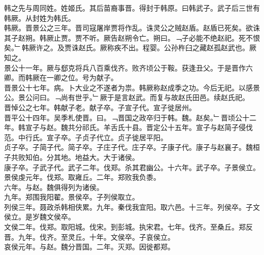 \documentclass{zhvt-classic}
\begin{document}
\hspace*{2em}韩之先与周同姓。姓姬氏。其后苗裔事晋。得封于韩原。曰韩武子。武子后三世有韩厥。从封姓为韩氏。\\
\hspace*{2em}韩厥。晋景公之三年。晋司寇屠岸贾将作乱。诛灵公之贼赵盾。赵盾已死矣。欲诛其子赵朔。韩厥止贾。贾不听。厥告赵朔令亡。朔曰。﹁子必能不绝赵祀。死不恨矣。﹂韩厥许之。及贾诛赵氏。厥称疾不出。程婴。公孙杵臼之藏赵孤赵武也。厥知之。\\
\hspace*{2em}景公十一年。厥与郄克将兵八百乘伐齐。败齐顷公于鞍。获逢丑父。于是晋作六卿。而韩厥在一卿之位。号为献子。\\
\hspace*{2em}晋景公十七年。病。卜大业之不遂者为祟。韩厥称赵成季之功。今后无祀。以感景公。景公问曰。﹁尚有世乎。﹂厥于是言赵武。而复与故赵氏田邑。续赵氏祀。\\
\hspace*{2em}晋悼公之七年。韩献子老。献子卒。子宣子代。宣子徙居州。\\
\hspace*{2em}晋平公十四年。吴季札使晋。曰。﹁晋国之政卒归于韩。魏。赵矣。﹂晋顷公十二年。韩宣子与赵。魏共分祁氏。羊舌氏十县。晋定公十五年。宣子与赵简子侵伐范。中行氏。宣子卒。子贞子代立。贞子徙居平阳。\\
\hspace*{2em}贞子卒。子简子代。简子卒。子庄子代。庄子卒。子康子代。康子与赵襄子。魏桓子共败知伯。分其地。地益大。大于诸侯。\\
\hspace*{2em}康子卒。子武子代。武子二年。伐郑。杀其君幽公。十六年。武子卒。子景侯立。\\
\hspace*{2em}景侯虔元年。伐郑。取雍丘。二年。郑败我负黍。\\
\hspace*{2em}六年。与赵。魏俱得列为诸侯。\\
\hspace*{2em}九年。郑围我阳翟。景侯卒。子列侯取立。\\
\hspace*{2em}列侯三年。聂政杀韩相侠累。九年。秦伐我宜阳。取六邑。十三年。列侯卒。子文侯立。是岁魏文侯卒。\\
\hspace*{2em}文侯二年。伐郑。取阳城。伐宋。到彭城。执宋君。七年。伐齐。至桑丘。郑反晋。九年。伐齐。至灵丘。十年。文侯卒。子哀侯立。\\
\hspace*{2em}哀侯元年。与赵。魏分晋国。二年。灭郑。因徙都郑。\\
\end{document}

